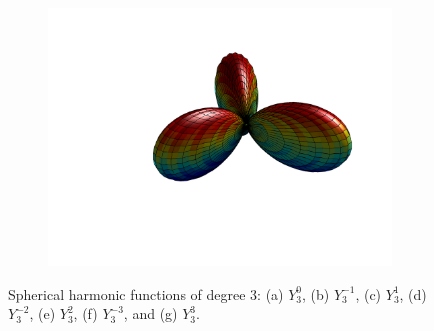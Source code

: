 \begin{figure}
\begin{subfigure}[b]{0.40\textwidth}
		\includegraphics[width=\textwidth]{figures/appendices/Y_3_3.png}
		\caption{}
	\end{subfigure}
\caption{Spherical harmonic functions of degree 3: (a) $Y_{3}^{0}$, (b) $Y_{3}^{-1}$, (c) $Y_{3}^{1}$, (d) $Y_{3}^{-2}$, (e) $Y_{3}^{2}$, (f) $Y_{3}^{-3}$, and (g) $Y_{3}^{3}$.}
\end{figure}

